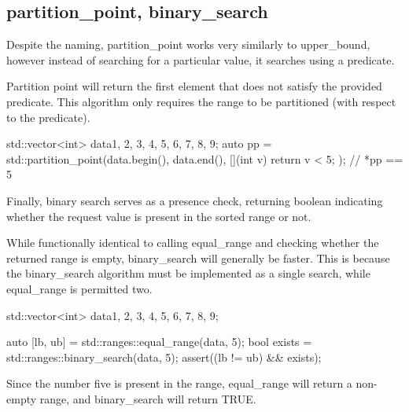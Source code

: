 \subsection{partition\_point, binary\_search}

Despite the naming, partition\_point works very similarly to upper\_bound, however instead of searching for a particular value, it searches using a predicate.



Partition point will return the first element that does not satisfy the provided predicate. This algorithm only requires the range to be partitioned (with respect to the predicate).

\begin{box-note}
\begin{cppcode}
std::vector<int> data{1, 2, 3, 4, 5, 6, 7, 8, 9};
auto pp = std::partition_point(data.begin(), data.end(), 
                                [](int v) { return v < 5; });
// *pp == 5
\end{cppcode}
\end{box-note}

Finally, binary search serves as a presence check, returning boolean indicating whether the request value is present in the sorted range or not.



While functionally identical to calling equal\_range and checking whether the returned range is empty, binary\_search will generally be faster. This is because the binary\_search algorithm must be implemented as a single search, while equal\_range is permitted two.

\begin{box-note}
\begin{cppcode}
std::vector<int> data{1, 2, 3, 4, 5, 6, 7, 8, 9};

auto [lb, ub] = std::ranges::equal_range(data, 5);
bool exists = std::ranges::binary_search(data, 5);
assert((lb != ub) && exists);
\end{cppcode}
\end{box-note}

Since the number five is present in the range, equal\_range will return a non-empty range, and binary\_search will return TRUE.

